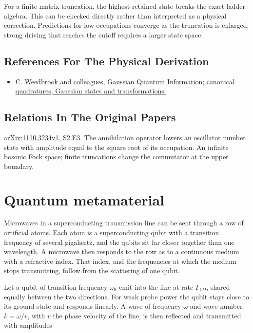 \documentclass[11pt,oneside]{book}
\begin{document}
For a finite matrix truncation, the highest retained state breaks the exact ladder algebra. This can be checked directly rather than interpreted as a physical correction. Predictions for low occupations converge as the truncation is enlarged; strong driving that reaches the cutoff requires a larger state space.

\subsection*{References For The Physical Derivation}
\begin{itemize}
\item \href{https://arxiv.org/abs/1110.3234}{C. Weedbrook and colleagues, Gaussian Quantum Information; canonical quadratures, Gaussian states and transformations.}
\end{itemize}

\subsection*{Relations In The Original Papers}

\href{https://arxiv.org/html/1110.3234v1#S2.E3}{arXiv:1110.3234v1, S2.E3}. The annihilation operator lowers an oscillator number state with amplitude equal to the square root of its occupation. An infinite bosonic Fock space; finite truncations change the commutator at the upper boundary.



\clearpage

\section{Quantum metamaterial}

\label{topic:quantum-metamaterial}

Microwaves in a superconducting transmission line can be sent through a row of artificial atoms. Each atom is a superconducting qubit with a transition frequency of several gigahertz, and the qubits sit far closer together than one wavelength. A microwave then responds to the row as to a continuous medium with a refractive index. That index, and the frequencies at which the medium stops transmitting, follow from the scattering of one qubit.

Let a qubit of transition frequency \(\omega_0\) emit into the line at rate \(\Gamma_{1D}\), shared equally between the two directions. For weak probe power the qubit stays close to its ground state and responds linearly. A wave of frequency \(\omega\) and wave number \(k=\omega/v\), with \(v\) the phase velocity of the line, is then reflected and transmitted with amplitudes
\end{document}

